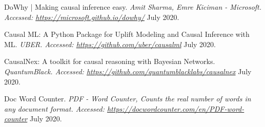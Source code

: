 \begin{thebibliography}{1}
 DoWhy | Making causal inference easy. {\em 	Amit Sharma, Emre Kiciman - Microsoft. Accessed:  \url{https://microsoft.github.io/dowhy/}} July 2020.

 Causal ML: A Python Package for Uplift Modeling and Causal Inference with ML. {\em UBER. Accessed:  \url{https://github.com/uber/causalml}} July 2020.

 CausalNex: A toolkit for causal reasoning with Bayesian Networks. {\em QuantumBlack. Accessed:  \url{https://github.com/quantumblacklabs/causalnex}} July 2020.

 Doc Word Counter. {\em 	PDF - Word Counter, Counts the real number of words in any document format. Accessed:  \url{https://docwordcounter.com/en/PDF-word-counter}} July 2020.

\end{thebibliography}